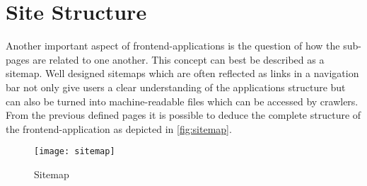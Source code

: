 \section{Site Structure}
Another important aspect of frontend-applications is the question of how the sub-pages are related to one another. This concept can best be described as a sitemap. Well designed sitemaps which are often reflected as links in a navigation bar not only give users a clear understanding of the applications structure but can also be turned into machine-readable files which can be accessed by crawlers. From the previous defined pages it is possible to deduce the complete structure of the frontend-application as depicted in \autoref{fig:sitemap}. \newline

\begin{figure}[H]
    \begin{center}
    \texttt{[image: sitemap]}
    \end{center}
    \caption{Sitemap}
    \label{fig:sitemap}
\end{figure}
